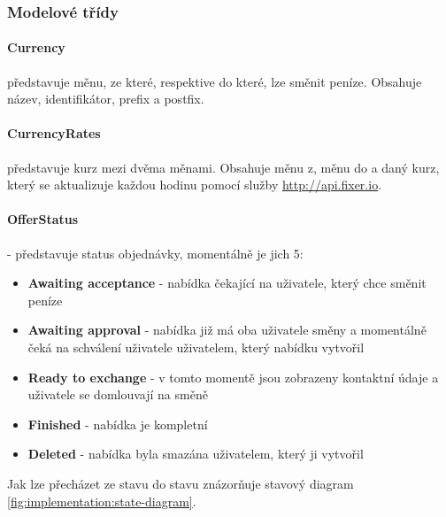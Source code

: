 \subsubsection{Modelové třídy}

\paragraph*{Currency} představuje měnu, ze které, respektive do které, lze směnit peníze. Obsahuje název, identifikátor, prefix a postfix.
\paragraph*{CurrencyRates} představuje kurz mezi dvěma měnami. Obsahuje měnu z, měnu do a daný kurz, který se aktualizuje každou hodinu pomocí služby \url{http://api.fixer.io}.
\paragraph*{OfferStatus} - představuje status objednávky, momentálně je jich 5:
\begin{itemize}
    \item \textbf{Awaiting acceptance} - nabídka čekající na uživatele, který chce směnit peníze
    \item \textbf{Awaiting approval} - nabídka již má oba uživatele směny a momentálně čeká na schválení uživatele uživatelem, který nabídku vytvořil
    \item \textbf{Ready to exchange} - v tomto momentě jsou zobrazeny kontaktní údaje a uživatele se domlouvají na směně
    \item \textbf{Finished} - nabídka je kompletní
    \item \textbf{Deleted} - nabídka byla smazána uživatelem, který ji vytvořil
\end{itemize}

Jak lze přecházet ze stavu do stavu znázorňuje stavový diagram \ref{fig:implementation:state-diagram}.

